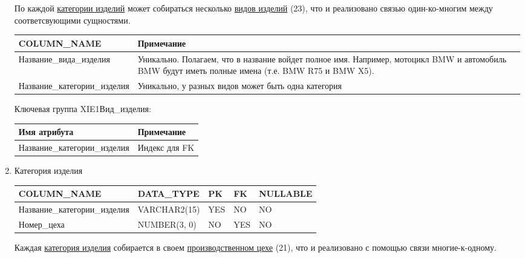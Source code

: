 \begin{enumerate}
\begin{tabular}{|p{4cm}|p{3cm}|p{1cm}|p{1cm}|p{2cm}|}
    \end{tabular}

    По каждой \underline{категории изделий} может собираться несколько \underline{видов изделий} (23), что и реализовано связью один-ко-многим между соответсвующими сущностями.

    \begin{tabular}{|p{4cm}|p{5cm}|} \hline

        {\bf COLUMN\_NAME} & {\bf Примечание} \\ \hline
        Название\_вида\_изделия & Уникально. Полагаем, что в название войдет полное имя. Например, мотоцикл BMW и автомобиль BMW будут иметь полные имена (т.е. BMW R75 и BMW X5).  \\ \hline
        Название\_категории\_изделия & Уникально, у разных видов может быть одна категория \\ \hline

    \end{tabular}

    Ключевая группа XIE1Вид\_изделия:

    \begin{tabular}{|p{4cm}|p{5cm}|} \hline

        {\bf Имя атрибута} & {\bf Примечание} \\ \hline
        Название\_категории\_изделия & Индекс для FK \\ \hline

    \end{tabular}

    \item{Категория изделия}

    \begin{tabular}{|p{4cm}|p{3cm}|p{1cm}|p{1cm}|p{2cm}|} \hline

        {\bf COLUMN\_NAME} & {\bf DATA\_TYPE} & {\bf PK} & {\bf FK} & {\bf NULLABLE} \\ \hline
        Название\_категории\_изделия & VARCHAR2(15) & YES & NO & NO \\ \hline
        Номер\_цеха & NUMBER(3, 0) & NO & YES & NO \\ \hline

    \end{tabular}

    Каждая \underline{категория изделия} собирается в своем \underline{производственном цехе} (21), что и реализовано с помощью связи многие-к-одному.

    \begin{tabular}{|p{4cm}|p{5cm}|} \hline


\end{tabular}
\end{enumerate}
